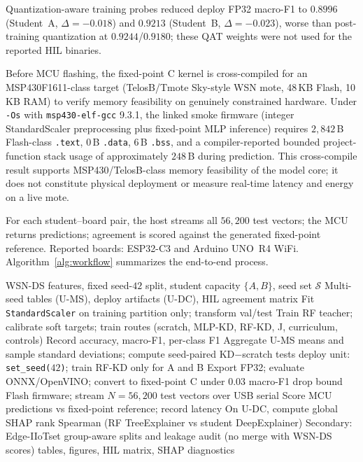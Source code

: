 \documentclass[journal]{IEEEtran}
\newcommand{\method}{TinyRF-KD}
\newcommand{\dataset}{WSN-DS}
\newcommand{\ums}{U-MS}
\newcommand{\udc}{U-DC}
\begin{document}
Quantization-aware training probes reduced deploy FP32 macro-F1 to $0.8996$ (Student~A, $\Delta = -0.018$) and $0.9213$ (Student~B, $\Delta = -0.023$), worse than post-training quantization at $0.9244$/$0.9180$; these QAT weights were not used for the reported HIL binaries.

Before MCU flashing, the fixed-point C kernel is cross-compiled for an MSP430F1611-class target (TelosB/Tmote Sky-style WSN mote, 48\,KB Flash, 10\,KB RAM) to verify memory feasibility on genuinely constrained hardware.
Under \texttt{-Os} with \texttt{msp430-elf-gcc} 9.3.1, the linked smoke firmware (integer StandardScaler preprocessing plus fixed-point MLP inference) requires $2{,}842$\,B Flash-class \texttt{.text}, $0$\,B \texttt{.data}, $6$\,B \texttt{.bss}, and a compiler-reported bounded project-function stack usage of approximately $248$\,B during prediction.
This cross-compile result supports MSP430/TelosB-class memory feasibility of the model core; it does not constitute physical deployment or measure real-time latency and energy on a live mote.

For each student--board pair, the host streams all $56{,}200$ test vectors; the MCU returns predictions; agreement is scored against the generated fixed-point reference.
Reported boards: ESP32-C3 and Arduino UNO~R4 WiFi.
Algorithm~\ref{alg:workflow} summarizes the end-to-end process.

\begin{algorithm}[!t]
\caption{\method{} training and dual-MCU HIL workflow}
\label{alg:workflow}
\begin{algorithmic}[1]
\REQUIRE \dataset{} features, fixed seed-$42$ split, student capacity $\{A,B\}$, seed set $\mathcal{S}$
\ENSURE Multi-seed tables (\ums{}), deploy artifacts (\udc{}), HIL agreement matrix
\STATE Fit \texttt{StandardScaler} on training partition only; transform val/test
  \STATE Train RF teacher; calibrate soft targets; train routes (scratch, MLP-KD, RF-KD, J, curriculum, controls)
  \STATE Record accuracy, macro-F1, per-class F1
\ENDFOR
\STATE Aggregate \ums{} means and sample standard deviations; compute seed-paired KD$-$scratch tests
\STATE deploy unit: \texttt{set\_seed($42$)}; train RF-KD only for A and B
\STATE Export FP32; evaluate ONNX/OpenVINO; convert to fixed-point C under $0.03$ macro-F1 drop bound
  \STATE Flash firmware; stream $N = 56{,}200$ test vectors over USB serial
  \STATE Score MCU predictions vs fixed-point reference; record latency
\ENDFOR
\STATE On \udc{}, compute global SHAP rank Spearman (RF TreeExplainer vs student DeepExplainer)
\STATE Secondary: Edge-IIoTset group-aware splits and leakage audit (no merge with \dataset{} scores)
\RETURN tables, figures, HIL matrix, SHAP diagnostics
\end{algorithmic}
\end{algorithm}
\end{document}

